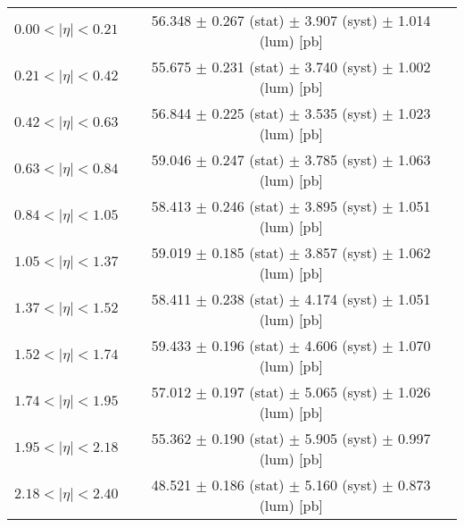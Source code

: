 \begin{tabular}{lc}
\hline
$0.00 < |\eta| <0.21$          & 56.348 $\pm$ 0.267 (stat) $\pm$ 3.907 (syst) $\pm$ 1.014 (lum) [pb]  \\
$0.21 < |\eta| <0.42$          & 55.675 $\pm$ 0.231 (stat) $\pm$ 3.740 (syst) $\pm$ 1.002 (lum) [pb]  \\
$0.42 < |\eta| <0.63$          & 56.844 $\pm$ 0.225 (stat) $\pm$ 3.535 (syst) $\pm$ 1.023 (lum) [pb]  \\
$0.63 < |\eta| <0.84$          & 59.046 $\pm$ 0.247 (stat) $\pm$ 3.785 (syst) $\pm$ 1.063 (lum) [pb]  \\
$0.84 < |\eta| <1.05$          & 58.413 $\pm$ 0.246 (stat) $\pm$ 3.895 (syst) $\pm$ 1.051 (lum) [pb]  \\
$1.05 < |\eta| <1.37$          & 59.019 $\pm$ 0.185 (stat) $\pm$ 3.857 (syst) $\pm$ 1.062 (lum) [pb]  \\
$1.37 < |\eta| <1.52$          & 58.411 $\pm$ 0.238 (stat) $\pm$ 4.174 (syst) $\pm$ 1.051 (lum) [pb]  \\
$1.52 < |\eta| <1.74$          & 59.433 $\pm$ 0.196 (stat) $\pm$ 4.606 (syst) $\pm$ 1.070 (lum) [pb]  \\
$1.74 < |\eta| <1.95$          & 57.012 $\pm$ 0.197 (stat) $\pm$ 5.065 (syst) $\pm$ 1.026 (lum) [pb]  \\
$1.95 < |\eta| <2.18$          & 55.362 $\pm$ 0.190 (stat) $\pm$ 5.905 (syst) $\pm$ 0.997 (lum) [pb]  \\
$2.18 < |\eta| <2.40$          & 48.521 $\pm$ 0.186 (stat) $\pm$ 5.160 (syst) $\pm$ 0.873 (lum) [pb]  \\
\hline
\end{tabular}
